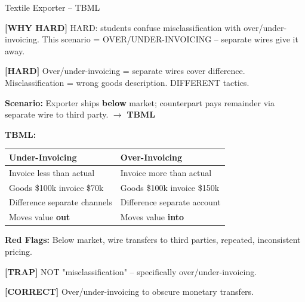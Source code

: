 \documentclass[6pt,aspectratio=169,fontsize=5pt]{beamer}
\renewcommand{\tiny}{\fontsize{3.5pt}{4.5pt}\selectfont}
\renewcommand{\normalsize}{\fontsize{7.5pt}{8.5pt}\selectfont}
\newcommand{\trap}[1]{%
	\begin{block}{\textcolor{redtrap}{\textbf{[TRAP]}}}
		\textcolor{redtrap}{\tiny #1}
	\end{block}
}
\newcommand{\correct}[1]{%
	\begin{block}{\textcolor{greencorrect}{\textbf{[CORRECT]}}}
		\textcolor{greencorrect}{\tiny #1}
	\end{block}
}
\newcommand{\hard}[1]{%
	\begin{block}{\textcolor{hardcolor}{\textbf{[HARD]}}}
		\textcolor{hardcolor}{\tiny #1}
	\end{block}
}
\newcommand{\hardexplain}[1]{%
	\begin{block}{\textcolor{orangehard}{\textbf{[WHY HARD]}}}
		\textcolor{orangehard}{\tiny #1}
	\end{block}
}
\begin{document}
	\begin{frame}{\normalsize Textile Exporter -- TBML}
		
		\hardexplain{HARD: students confuse misclassification with over/under-invoicing. This scenario = OVER/UNDER-INVOICING -- separate wires give it away.}
		
		\hard{Over/under-invoicing = separate wires cover difference. Misclassification = wrong goods description. DIFFERENT tactics.}
		
		\textbf{Scenario:} Exporter ships \textbf{below} market; counterpart pays remainder via separate wire to third party. $\to$ \textbf{TBML}
		
		\textbf{TBML:}
		\begin{table}
			\begin{tabular}{|p{3.5cm}|p{3.5cm}|}
				\hline
				\textbf{Under-Invoicing} & \textbf{Over-Invoicing} \\
				\hline
				Invoice less than actual & Invoice more than actual \\
				\hline
				Goods \$100k invoice \$70k & Goods \$100k invoice \$150k \\
				\hline
				Difference separate channels & Difference separate account \\
				\hline
				Moves value \textbf{out} & Moves value \textbf{into} \\
				\hline
			\end{tabular}
		\end{table}
		
		\textbf{Red Flags:} Below market, wire transfers to third parties, repeated, inconsistent pricing.
		
		\trap{NOT "misclassification" -- specifically over/under-invoicing.}
		
		\correct{Over/under-invoicing to obscure monetary transfers.}
	\end{frame}
	
\end{document}

